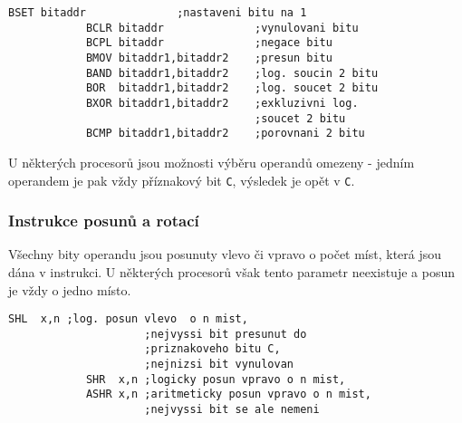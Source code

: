           \begin{table}[ht!]
            \caption*{ }
          \end{table}

          \begin{lstlisting}[style=luaMITASMStyle]
            BSET bitaddr              ;nastaveni bitu na 1
            BCLR bitaddr              ;vynulovani bitu
            BCPL bitaddr              ;negace bitu
            BMOV bitaddr1,bitaddr2    ;presun bitu
            BAND bitaddr1,bitaddr2    ;log. soucin 2 bitu
            BOR  bitaddr1,bitaddr2    ;log. soucet 2 bitu 
            BXOR bitaddr1,bitaddr2    ;exkluzivni log. 
                                      ;soucet 2 bitu
            BCMP bitaddr1,bitaddr2    ;porovnani 2 bitu
          \end{lstlisting}
          
          U některých procesorů jsou možnosti výběru operandů omezeny - jedním operandem je pak 
          vždy příznakový bit \texttt{C}, výsledek je opět v \texttt{C}.
          
        \subsubsection{Instrukce posunů a rotací}          
          Všechny bity operandu jsou posunuty vlevo či vpravo o počet míst, která jsou dána v 
          instrukci. U některých procesorů však tento parametr neexistuje a posun je vždy o jedno 
          místo.
          \begin{lstlisting}[style=luaMITASMStyle]
            SHL  x,n ;log. posun vlevo  o n mist, 
                     ;nejvyssi bit presunut do
                     ;priznakoveho bitu C, 
                     ;nejnizsi bit vynulovan
            SHR  x,n ;logicky posun vpravo o n mist, 
            ASHR x,n ;aritmeticky posun vpravo o n mist, 
                     ;nejvyssi bit se ale nemeni
          \end{lstlisting}

